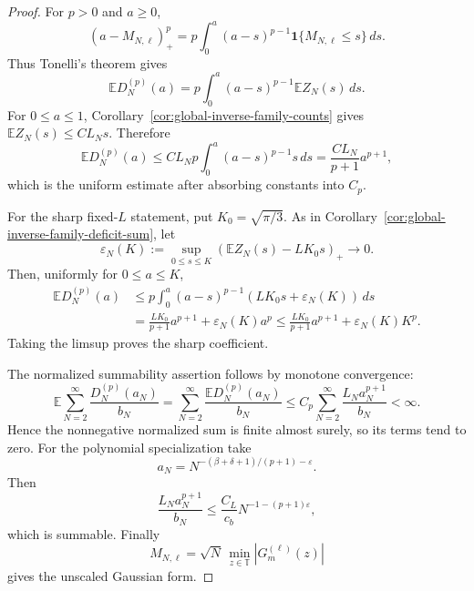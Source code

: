 \documentclass[11pt]{amsart}
\numberwithin{equation}{section}
\theoremstyle{definition}
\theoremstyle{remark}
\newcommand{\T}{\mathbb T}
\newcommand{\Exp}{\mathbb E}
\newcommand{\eps}{\varepsilon}
\begin{document}
\begin{proof}
For \(p>0\) and \(a\ge0\),
\[
  (a-M_{N,\ell})_+^p
  =
  p\int_0^a (a-s)^{p-1}\mathbf1\{M_{N,\ell}\le s\}\,ds .
\]
Thus Tonelli's theorem gives
\[
  \Exp D_N^{(p)}(a)
  =
  p\int_0^a (a-s)^{p-1}\Exp Z_N(s)\,ds .
\]
For \(0\le a\le1\), Corollary~\ref{cor:global-inverse-family-counts} gives
\(\Exp Z_N(s)\le CL_Ns\).  Therefore
\[
  \Exp D_N^{(p)}(a)
  \le
  CL_Np\int_0^a (a-s)^{p-1}s\,ds
  =
  \frac{CL_N}{p+1}a^{p+1},
\]
which is the uniform estimate after absorbing constants into \(C_p\).

For the sharp fixed-\(L\) statement, put \(K_0=\sqrt{\pi/3}\).  As in
Corollary~\ref{cor:global-inverse-family-deficit-sum}, let
\[
  \varepsilon_N(K):=
  \sup_{0\le s\le K}
  \left(\Exp Z_N(s)-LK_0s\right)_+
  \longrightarrow0 .
\]
Then, uniformly for \(0\le a\le K\),
\[
\begin{aligned}
  \Exp D_N^{(p)}(a)
  &\le
  p\int_0^a (a-s)^{p-1}(LK_0s+\varepsilon_N(K))\,ds  \\
  &=
  \frac{LK_0}{p+1}a^{p+1}+\varepsilon_N(K)a^p
  \le
  \frac{LK_0}{p+1}a^{p+1}+\varepsilon_N(K)K^p .
\end{aligned}
\]
Taking the limsup proves the sharp coefficient.

The normalized summability assertion follows by monotone convergence:
\[
  \Exp\sum_{N=2}^\infty \frac{D_N^{(p)}(a_N)}{b_N}
  =
  \sum_{N=2}^\infty \frac{\Exp D_N^{(p)}(a_N)}{b_N}
  \le
  C_p\sum_{N=2}^\infty \frac{L_Na_N^{p+1}}{b_N}
  <\infty .
\]
Hence the nonnegative normalized sum is finite almost surely, so its terms tend
to zero.  For the polynomial specialization take
\[
  a_N=N^{-(\beta+\delta+1)/(p+1)-\eps}.
\]
Then
\[
  \frac{L_Na_N^{p+1}}{b_N}
  \le \frac{C_L}{c_b}N^{-1-(p+1)\eps},
\]
which is summable.  Finally
\[
  M_{N,\ell}=\sqrt N\,\min_{z\in\T}|G_m^{(\ell)}(z)|
\]
gives the unscaled Gaussian form.
\end{proof}
\end{document}
